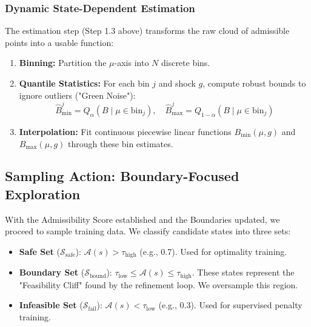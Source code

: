 \subsubsection{Dynamic State-Dependent Estimation}\label{sec:dynamic_bounds}
The estimation step (Step 1.3 above) transforms the raw cloud of admissible points into a usable function:
\begin{enumerate}
    \item \textbf{Binning:} Partition the $\mu$-axis into $N$ discrete bins.
    \item \textbf{Quantile Statistics:} For each bin $j$ and shock $g$, compute robust bounds to ignore outliers ("Green Noise"):
    \[ \hat{B}_{\min}^j = Q_{\alpha}(B \mid \mu \in \text{bin}_j), \quad \hat{B}_{\max}^j = Q_{1-\alpha}(B \mid \mu \in \text{bin}_j) \]
    \item \textbf{Interpolation:} Fit continuous piecewise linear functions $B_{\min}(\mu, g)$ and $B_{\max}(\mu, g)$ through these bin estimates.
\end{enumerate}

\subsection{Sampling Action: Boundary-Focused Exploration}\label{sec:sampling_action}

With the Admissibility Score established and the Boundaries updated, we proceed to sample training data. We classify candidate states into three sets:

\begin{itemize}
    \item \textbf{Safe Set} ($\mathcal{S}_{\text{safe}}$): $\mathcal{A}(s) > \tau_{\text{high}}$ (e.g., 0.7). Used for optimality training.
    \item \textbf{Boundary Set} ($\mathcal{S}_{\text{bound}}$): $\tau_{\text{low}} \le \mathcal{A}(s) \le \tau_{\text{high}}$. These states represent the "Feasibility Cliff" found by the refinement loop. We oversample this region.
    \item \textbf{Infeasible Set} ($\mathcal{S}_{\text{fail}}$): $\mathcal{A}(s) < \tau_{\text{low}}$ (e.g., 0.3). Used for supervised penalty training.
\end{itemize}







